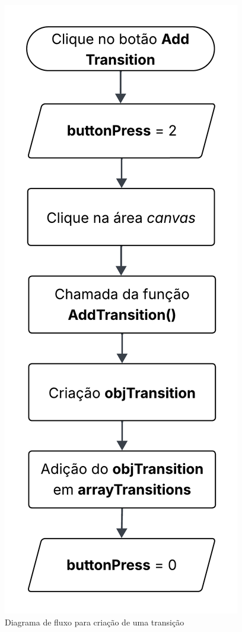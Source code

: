 \documentclass[
	12pt,				%
	openright,			%
	oneside,			%
	a4paper,			%
	english,			%
	brazil				%
	]{abntex2}
\theoremstyle{doispontos}
\begin{document}
\begin{figure}[ht] 
	\centering
	\includegraphics[scale=0.2]{figuras/diagrama-fluxo-addTransition.png}
	\caption[Diagrama de fluxo para criação de uma transição]{Diagrama de fluxo para criação de uma transição}
	\label{fig:addTransitionDiagram}
\end{figure}
\FloatBarrier
\end{document}
